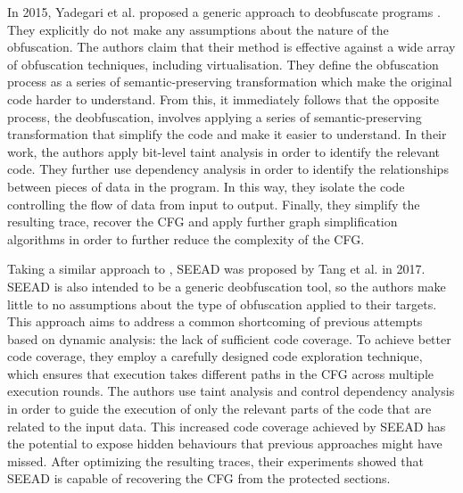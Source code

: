 In 2015, Yadegari et al. proposed a generic approach to deobfuscate programs \cite{yadegari2015}. They explicitly do not make any assumptions about the nature of the obfuscation. The authors claim that their method is effective against a wide array of obfuscation techniques, including virtualisation. They define the obfuscation process as a series of semantic-preserving transformation which make the original code harder to understand. From this, it immediately follows that the opposite process, the deobfuscation, involves applying a series of semantic-preserving transformation that simplify the code and make it easier to understand. In their work, the authors apply bit-level taint analysis in order to identify the relevant code. They further use dependency analysis in order to identify the relationships between pieces of data in the program. In this way, they isolate the code controlling the flow of data from input to output. Finally, they simplify the resulting trace, recover the \gls{CFG} and apply further graph simplification algorithms in order to further reduce the complexity of the \gls{CFG}.

Taking a similar approach to \cite{yadegari2015}, SEEAD \cite{tang2017seead} was proposed by Tang et al. in 2017. SEEAD is also intended to be a generic deobfuscation tool, so the authors make little to no assumptions about the type of obfuscation applied to their targets. This approach aims to address a common shortcoming of previous attempts based on dynamic analysis: the lack of sufficient code coverage. To achieve better code coverage, they employ a carefully designed code exploration technique, which ensures that execution takes different paths in the \gls{CFG} across multiple execution rounds. The authors use taint analysis and control dependency analysis in order to guide the execution of only the relevant parts of the code that are related to the input data. This increased code coverage achieved by SEEAD has the potential to expose hidden behaviours that previous approaches might have missed. After optimizing the resulting traces, their experiments showed that SEEAD is capable of recovering the \gls{CFG} from the protected sections.

